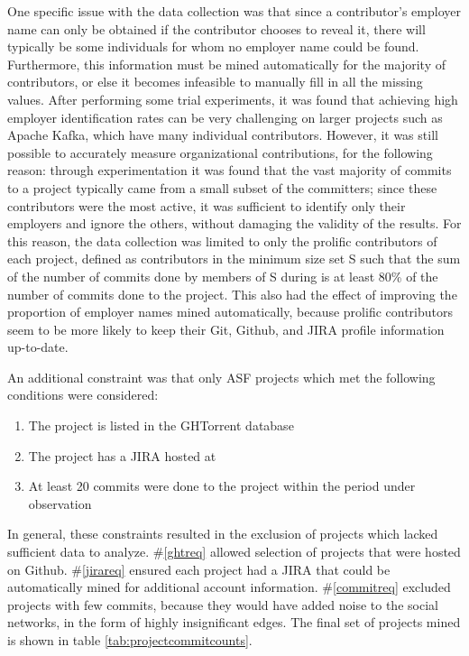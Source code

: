 One specific issue with the data collection was that since a contributor's employer name can only be obtained if the contributor chooses to reveal it, there will typically be some individuals for whom no employer name could be found. Furthermore, this information must be mined automatically for the majority of contributors, or else it becomes infeasible to manually fill in all the missing values. After performing some trial experiments, it was found that achieving high employer identification rates can be very challenging on larger projects such as Apache Kafka, which have many individual contributors. 
However, it was still possible to accurately measure organizational contributions, for the following reason: through experimentation it was found that the vast majority of commits to a project typically came from a small subset of the committers; since these contributors were the most active, it was sufficient to identify only their employers and ignore the others, without damaging the validity of the results. For this reason, the data collection was limited to only the prolific contributors of each project, defined as contributors in the minimum size set S such that the sum of the number of commits done by members of S during \timeperiod{} is at least 80\% of the number of commits done to the project. This also had the effect of improving the proportion of employer names mined automatically, because prolific contributors seem to be more likely to keep their Git, Github, and JIRA profile information up-to-date.

An additional constraint was that only ASF projects which met the following conditions were considered:
\begin{enumerate}
	\item \label{ghtreq} The project is listed in the GHTorrent database
	\item \label{jirareq} The project has a JIRA hosted at \ASFJIRAURL
	\item \label{commitreq} At least 20 commits were done to the project within the period under observation
\end{enumerate}
In general, these constraints resulted in the exclusion of projects which lacked sufficient data to analyze. \#\ref{ghtreq} allowed selection of projects that were hosted on Github. \#\ref{jirareq} ensured each project had a JIRA that could be automatically mined for additional account information. \#\ref{commitreq} excluded projects with few commits, because they would have added noise to the social networks, in the form of highly insignificant edges. The final set of projects mined is shown in table \ref{tab:projectcommitcounts}.

